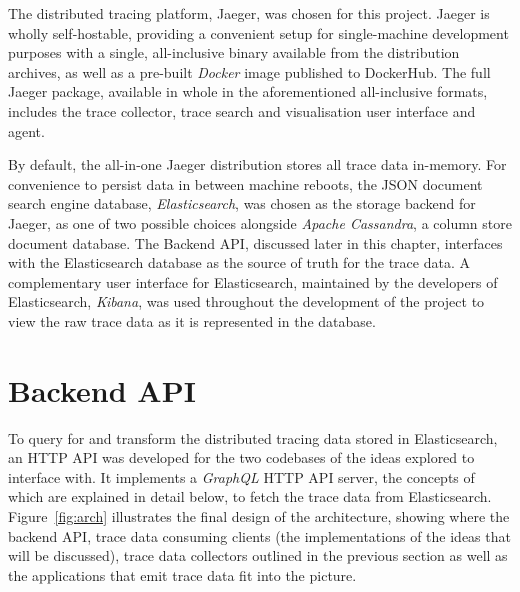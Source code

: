 \documentclass[12pt,pdftex,titlepage]{report}
\begin{document}
            The distributed tracing platform, Jaeger, was chosen for this project. Jaeger is wholly self-hostable, providing a convenient setup for single-machine development purposes with
            a single, all-inclusive binary available from the distribution archives, as well as a pre-built \textit{Docker}\cite{docker} image published to DockerHub. The full Jaeger package,
            available in whole in the aforementioned all-inclusive formats, includes the trace collector, trace search and visualisation user interface and agent.

            By default, the all-in-one Jaeger distribution stores all trace data in-memory. For convenience to persist data in between machine reboots, the JSON document search engine
            database, \textit{Elasticsearch}\cite{elasticsearch}, was chosen as the storage backend for Jaeger, as one of two possible choices alongside \textit{Apache Cassandra}\cite{cassandra}, 
            a column store document database. The Backend API, discussed later in this chapter, interfaces with the Elasticsearch database as the source of truth for the trace data. A complementary
            user interface for Elasticsearch, maintained by the developers of Elasticsearch, \textit{Kibana}, was used throughout the development of the project to view the raw trace data as it is 
            represented in the database.

        \section{Backend API}
            To query for and transform the distributed tracing data stored in Elasticsearch, an HTTP API was developed for the two codebases of the ideas explored to interface with.
            It implements a \textit{GraphQL}\cite{graphql} HTTP API server, the concepts of which are explained in detail below, to fetch the trace data from Elasticsearch. Figure~\ref{fig:arch}
            illustrates the final design of the architecture, showing where the backend API, trace data consuming clients (the implementations of the ideas that will be discussed), trace data 
            collectors outlined in the previous section as well as the applications that emit trace data fit into the picture.
\end{document}
